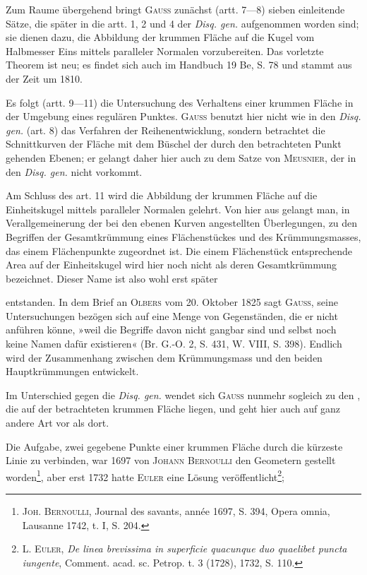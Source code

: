 Zum Raume übergehend bringt \textsc{Gauss} zunächst (artt. 7—8) sieben einleitende
Sätze, die später in die artt. 1, 2 und 4 der \textit{Disq. gen.} aufgenommen
worden sind; sie dienen dazu, die Abbildung der krummen Fläche auf die
Kugel vom Halbmesser Eins mittels paralleler Normalen vorzubereiten. Das
vorletzte Theorem ist neu; es findet sich auch im Handbuch 19 Be, S. 78 und
stammt aus der Zeit um 1810.
\par
Es folgt (artt. 9—11) die Untersuchung des Verhaltens einer krummen
Fläche in der Umgebung eines regulären Punktes. \textsc{Gauss} benutzt hier nicht
wie in den \textit{Disq. gen.} (art. 8) das Verfahren der Reihenentwicklung, sondern
betrachtet die Schnittkurven der Fläche mit dem Büschel der durch den betrachteten
Punkt gehenden Ebenen; er gelangt daher hier auch zu dem Satze
von \textsc{Meusnier}, der in den \textit{Disq. gen.} nicht vorkommt.
\par
Am Schluss des art. 11 wird die Abbildung der krummen Fläche auf die
Einheitskugel mittels paralleler Normalen gelehrt. Von hier aus gelangt man,
in Verallgemeinerung der bei den ebenen Kurven angestellten Überlegungen,
zu den Begriffen der Gesamtkrümmung eines Flächenstückes und des Krümmungsmasses,
das einem Flächenpunkte zugeordnet ist. Die einem Flächenstück
entsprechende Area auf der Einheitskugel wird hier noch nicht als
deren Gesamtkrümmung bezeichnet. Dieser Name ist also wohl erst später
\par\smallskip{}\par
\clearpage{}\setcounter{footnote}{0}
\noindent entstanden. In dem Brief an \textsc{Olbers} vom 20. Oktober 1825 sagt \textsc{Gauss},
seine Untersuchungen bezögen sich auf eine Menge von Gegenständen, die
er nicht anführen könne, »weil die Begriffe davon nicht gangbar sind und
selbst noch keine Namen dafür existieren« (Br. G.-O. 2, S. 431, W. VIII,
S. 398). Endlich wird der Zusammenhang zwischen dem Krümmungsmass und
den beiden Hauptkrümmungen entwickelt.
\par
Im Unterschied gegen die \textit{Disq. gen.} wendet sich \textsc{Gauss} nunmehr sogleich
zu den , die auf der betrachteten krummen Fläche liegen,
und geht hier auch auf ganz andere Art vor als dort.
\par
Die Aufgabe, zwei gegebene Punkte einer krummen Fläche durch die
kürzeste Linie zu verbinden, war 1697 von \textsc{Johann Bernoulli} den Geometern
gestellt worden\footnote{\textsc{Joh. Bernoulli}, Journal des savants, année 1697, S. 394, Opera omnia, Lausanne 1742, t. I, S. 204.}, aber erst 1732 hatte \textsc{Euler} eine Lösung veröffentlicht\footnote{\textsc{L. Euler}, \textit{De linea brevissima in superficie quacunque duo quaelibet puncta iungente}, Comment. acad. sc. Petrop. t. 3 (1728), 1732, S. 110.};
